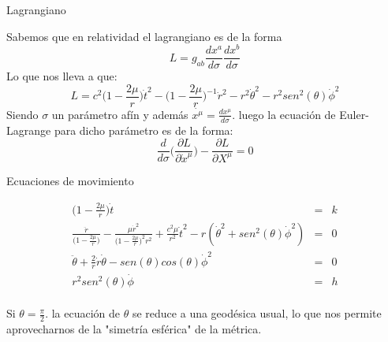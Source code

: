 \documentclass[xcolor=dvipsnames]{beamer}
\begin{document}
	
	\begin{frame}{Lagrangiano}
	    
	    \begin{block}{}
	   Sabemos que en relatividad el lagrangiano es de la forma
	    \begin{equation*}
	    L=g_{ab}\frac{dx^{a}}{d\sigma}\frac{dx^{b}}{d\sigma}
        \end{equation*}
       Lo que nos lleva a que:
	    \begin{equation*}
	    L=c^{2}\Big( 1-\frac{2\mu}{r} \Big)\dot{t}^{2}-\Big( 1-\frac{2\mu}{r} \Big)^{-1}\dot{r}^{2}-r^{2}\dot{\theta}^{2}-r^{2}sen^{2}(\theta)\dot{\phi}^{2}
        \end{equation*}       
       Siendo $\sigma$ un parámetro afín y además $\dot{x^{\mu}}=\frac{dx^{\mu}}{d\sigma}$. luego la ecuación de Euler-Lagrange para dicho parámetro es de la forma:
       \begin{equation*}
           \frac{d}{d\sigma}\Big(\frac{\partial L}{\partial \dot{x}^{\mu}} \Big)-\frac{\partial L}{\partial X^{\mu}}=0
       \end{equation*}
  \end{block}
	\end{frame}
	
	
	\begin{frame}{Ecuaciones de movimiento}
	    
	    \begin{block}{}
	    \begin{eqnarray}
      \Big(1-\frac{2\mu}{r} \Big)\dot{t}&=&k \label{0}\\
      \frac{\ddot{r}}{\Big(1-\frac{2\mu}{r} \Big)}-\frac{\mu\dot{r}^{2}}{\Big(1-\frac{2\mu}{r} \Big)^{2} r^{2}}+\frac{c^{2}\mu}{r^{2}}\dot{t}^{2}-r(\dot{\theta}^{2}+sen^{2}(\theta)\dot{\phi}^{2})&=&0 \label{1}\\
      \ddot{\theta}+\frac{2}{r}\dot{r}\dot{\theta}-sen(\theta)cos(\theta)\dot{\phi}^{2}&=&0 \label{2}\\
      r^{2}sen^{2}(\theta)\dot{\phi}&=&h\label{3}
        \end{eqnarray}\\
        
    Si $\theta=\frac{\pi}{2}$. la ecuación de $\theta$ se reduce a una geodésica usual, lo que nos permite aprovecharnos de la "simetría esférica" de la métrica.
        \end{block}
        \end{frame}
	
\end{document}
